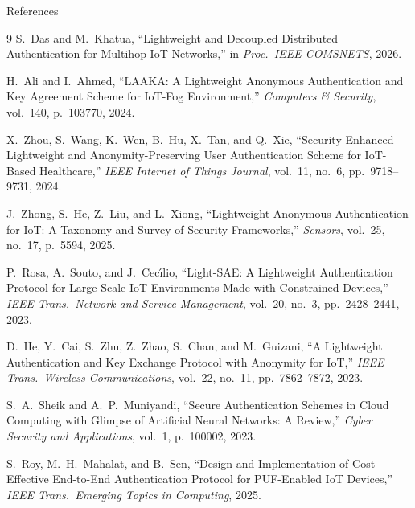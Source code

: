 \begin{frame}[allowframebreaks]{References}
    \scriptsize
    \begin{thebibliography}{9}
        S.\ Das and M.\ Khatua,
        ``Lightweight and Decoupled Distributed Authentication for Multihop IoT Networks,''
        in \emph{Proc.\ IEEE COMSNETS}, 2026.

        H.\ Ali and I.\ Ahmed,
        ``LAAKA: A Lightweight Anonymous Authentication and Key Agreement Scheme for
        IoT-Fog Environment,''
        \emph{Computers \& Security}, vol.\ 140, p.\ 103770, 2024.

        X.\ Zhou, S.\ Wang, K.\ Wen, B.\ Hu, X.\ Tan, and Q.\ Xie,
        ``Security-Enhanced Lightweight and Anonymity-Preserving User Authentication Scheme
        for IoT-Based Healthcare,''
        \emph{IEEE Internet of Things Journal}, vol.\ 11, no.\ 6, pp.\ 9718--9731, 2024.

        J.\ Zhong, S.\ He, Z.\ Liu, and L.\ Xiong,
        ``Lightweight Anonymous Authentication for IoT: A Taxonomy and Survey of
        Security Frameworks,''
        \emph{Sensors}, vol.\ 25, no.\ 17, p.\ 5594, 2025.

        P.\ Rosa, A.\ Souto, and J.\ Cec\'{\i}lio,
        ``Light-SAE: A Lightweight Authentication Protocol for Large-Scale IoT
        Environments Made with Constrained Devices,''
        \emph{IEEE Trans.\ Network and Service Management}, vol.\ 20, no.\ 3,
        pp.\ 2428--2441, 2023.

        D.\ He, Y.\ Cai, S.\ Zhu, Z.\ Zhao, S.\ Chan, and M.\ Guizani,
        ``A Lightweight Authentication and Key Exchange Protocol with Anonymity
        for IoT,'' \emph{IEEE Trans.\ Wireless Communications}, vol.\ 22, no.\ 11,
        pp.\ 7862--7872, 2023.

        S.\ A.\ Sheik and A.\ P.\ Muniyandi,
        ``Secure Authentication Schemes in Cloud Computing with Glimpse of
        Artificial Neural Networks: A Review,''
        \emph{Cyber Security and Applications}, vol.\ 1, p.\ 100002, 2023.

        S.\ Roy, M.\ H.\ Mahalat, and B.\ Sen,
        ``Design and Implementation of Cost-Effective End-to-End Authentication
        Protocol for PUF-Enabled IoT Devices,''
        \emph{IEEE Trans.\ Emerging Topics in Computing}, 2025.


\end{thebibliography}
\end{frame}
